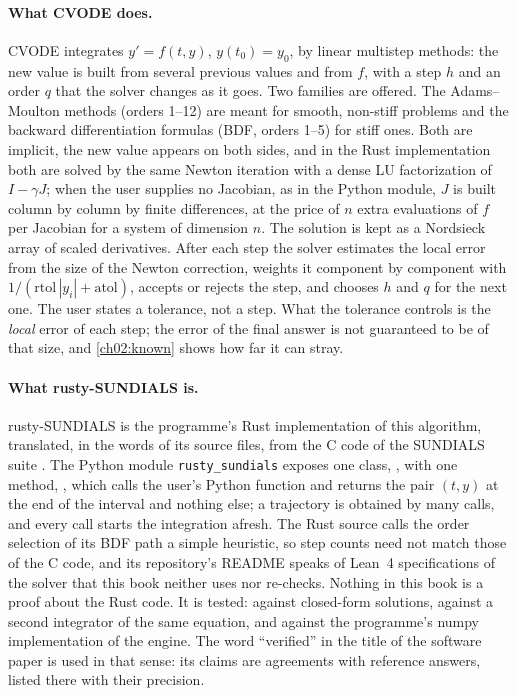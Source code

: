 \paragraph{What CVODE does.} CVODE integrates $y'=f(t,y)$, $y(t_0)=y_0$, by linear multistep methods: the new value is built from several previous values and from $f$, with a step $h$ and
an order $q$ that the solver changes as it goes. Two families are offered. The Adams--Moulton methods (orders 1--12) are meant for smooth, non-stiff problems and the backward differentiation formulas
(BDF, orders 1--5) for stiff ones. Both are implicit, the new value appears on both sides, and in the Rust implementation both are solved by the same Newton iteration with a dense LU factorization of
$I-\gamma J$; when the user supplies no Jacobian, as in the Python module, $J$ is built column by column by finite differences, at the price of $n$ extra evaluations of $f$ per Jacobian for a system of
dimension $n$. The solution is kept as a Nordsieck array of scaled derivatives. After each step the solver estimates the local error from the size of the Newton correction,
weights it component by component with $1/(\mathrm{rtol}\,|y_i|+\mathrm{atol})$, accepts or rejects the step, and chooses $h$ and $q$ for the next one. The user states a tolerance, not a step. What the
tolerance controls is the \emph{local} error of each step; the error of the final answer is not guaranteed to be of that size, and \cref{ch02:known} shows how far it can stray.

\paragraph{What rusty-SUNDIALS is.} rusty-SUNDIALS is the programme's Rust implementation of this algorithm, translated, in the words of its source files, from the C code of the SUNDIALS suite \cite{Hindmarsh2005}. The Python
module \texttt{rusty\_sundials} exposes one class, , with one method, , which calls the user's Python function  and
returns the pair $(t,y)$ at the end of the interval and nothing else; a trajectory is obtained by many calls, and every call starts the integration afresh. The Rust source calls the order selection of its BDF path a simple heuristic, so step counts need not match those of the C code, and its repository's README speaks of Lean~4 specifications of the solver that this book
neither uses nor re-checks. Nothing in this book is a proof about the Rust code. It is tested: against closed-form solutions, against a second integrator of the same equation, and against the programme's
numpy implementation of the engine. The word ``verified'' in the title of the software paper \cite{Callens2026sw} is used in that sense: its claims are agreements with reference answers, listed there with their precision.

